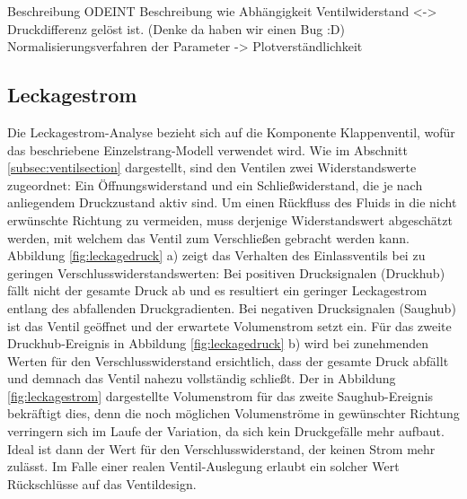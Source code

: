 \documentclass[fontsize=12pt, a4paper]{scrartcl}
\begin{document}
Beschreibung ODEINT
Beschreibung wie Abhängigkeit Ventilwiderstand <-> Druckdifferenz gelöst ist. (Denke da haben wir einen Bug :D)
Normalisierungsverfahren der Parameter -> Plotverständlichkeit

\subsection{Leckagestrom}

Die Leckagestrom-Analyse bezieht sich auf die Komponente Klappenventil, wofür das beschriebene Einzelstrang-Modell verwendet wird. Wie im Abschnitt \ref{subsec:ventilsection} dargestellt, sind den Ventilen zwei Widerstandswerte zugeordnet: Ein Öffnungswiderstand und ein Schließwiderstand, die je nach anliegendem Druckzustand aktiv sind. Um einen Rückfluss des Fluids in die nicht erwünschte Richtung zu vermeiden, muss derjenige Widerstandswert abgeschätzt werden, mit welchem das Ventil zum Verschließen gebracht werden kann. Abbildung \ref{fig:leckagedruck} a) zeigt das Verhalten des Einlassventils bei zu geringen Verschlusswiderstandswerten: Bei positiven Drucksignalen (Druckhub) fällt nicht der gesamte Druck ab und es resultiert ein geringer Leckagestrom entlang des abfallenden Druckgradienten. Bei negativen Drucksignalen (Saughub) ist das Ventil geöffnet und der erwartete Volumenstrom setzt ein. Für das zweite Druckhub-Ereignis in Abbildung \ref{fig:leckagedruck} b) wird bei zunehmenden Werten für den Verschlusswiderstand ersichtlich, dass der gesamte Druck abfällt und demnach das Ventil nahezu vollständig schließt. Der in  Abbildung \ref{fig:leckagestrom} dargestellte Volumenstrom für das zweite Saughub-Ereignis bekräftigt dies, denn die noch möglichen Volumenströme in gewünschter Richtung verringern sich im Laufe der Variation, da sich kein Druckgefälle mehr aufbaut. Ideal ist dann der Wert für den Verschlusswiderstand, der keinen Strom mehr zulässt. Im Falle einer realen Ventil-Auslegung erlaubt ein solcher Wert Rückschlüsse auf das Ventildesign.
\end{document}
